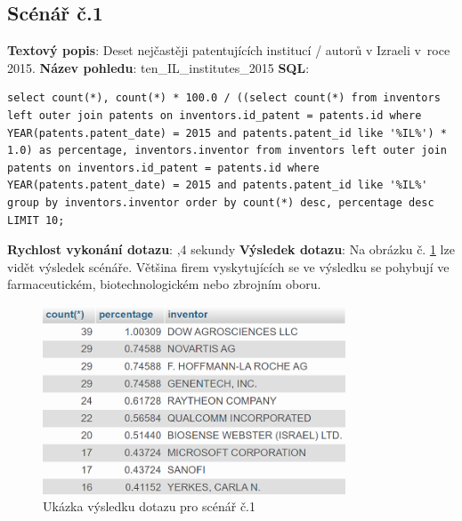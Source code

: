 \subsection{Scénář č.1}
\textbf{Textový popis}: Deset nejčastěji patentujících institucí / autorů v Izraeli v~roce 2015.
\newline
\textbf{Název pohledu}: ten\_IL\_institutes\_2015
\newline
\textbf{SQL}: 
\begin{lstlisting}[label = {lst:elements_a}]
select count(*), count(*) * 100.0 / ((select count(*) from inventors left outer join patents on inventors.id_patent = patents.id where YEAR(patents.patent_date) = 2015 and patents.patent_id like '%IL%') * 1.0) as percentage, inventors.inventor from inventors left outer join patents on inventors.id_patent = patents.id where YEAR(patents.patent_date) = 2015 and patents.patent_id like '%IL%' group by inventors.inventor order by count(*) desc, percentage desc LIMIT 10;
\end{lstlisting}
\textbf{Rychlost vykonání dotazu}:  ,4 sekundy
\newline
\textbf{Výsledek dotazu}: Na obrázku č. \ref{fig:scenar1} lze vidět výsledek scénáře. Většina firem vyskytujících se ve výsledku se pohybují ve farmaceutickém, biotechnologickém nebo zbrojním oboru.
\begin{figure}[H]
\centering
\includegraphics[width=9cm]{img/scenare/scenar_1}
\caption{Ukázka výsledku dotazu pro scénář č.1}
\label{fig:scenar1}
\end{figure}

\newpage
